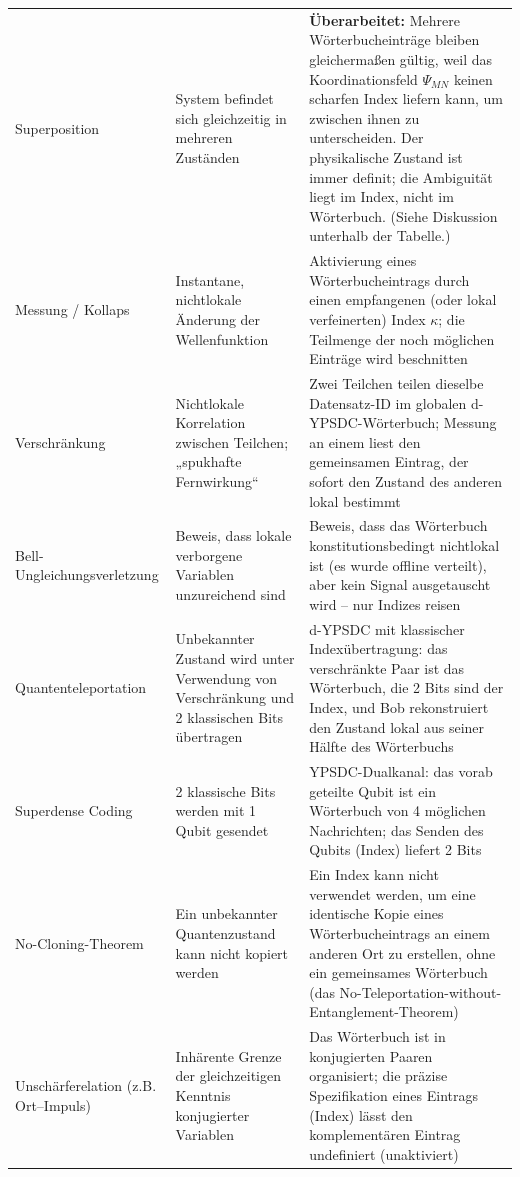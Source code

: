 \documentclass[12pt,a4paper]{article}
\theoremstyle{remark}
\begin{document}
\begin{longtable}{p{3.8cm} p{5cm} p{7cm}}
		Superposition &
		System befindet sich gleichzeitig in mehreren Zuständen &
		\textbf{Überarbeitet:} Mehrere Wörterbucheinträge bleiben gleichermaßen gültig, weil das Koordinationsfeld \(\Psi_{MN}\) keinen scharfen Index liefern kann, um zwischen ihnen zu unterscheiden. Der physikalische Zustand ist immer definit; die Ambiguität liegt im Index, nicht im Wörterbuch. (Siehe Diskussion unterhalb der Tabelle.) \\
		\addlinespace
		Messung / Kollaps &
		Instantane, nichtlokale Änderung der Wellenfunktion &
		Aktivierung eines Wörterbucheintrags durch einen empfangenen (oder lokal verfeinerten) Index \(\kappa\); die Teilmenge der noch möglichen Einträge wird beschnitten \\
		\addlinespace
		Verschränkung &
		Nichtlokale Korrelation zwischen Teilchen; „spukhafte Fernwirkung“ &
		Zwei Teilchen teilen dieselbe Datensatz-ID im globalen d-YPSDC-Wörterbuch; Messung an einem liest den gemeinsamen Eintrag, der sofort den Zustand des anderen lokal bestimmt \\
		\addlinespace
		Bell-Ungleichungsverletzung &
		Beweis, dass lokale verborgene Variablen unzureichend sind &
		Beweis, dass das Wörterbuch konstitutionsbedingt nichtlokal ist (es wurde offline verteilt), aber kein Signal ausgetauscht wird – nur Indizes reisen \\
		\addlinespace
		Quantenteleportation &
		Unbekannter Zustand wird unter Verwendung von Verschränkung und 2 klassischen Bits übertragen &
		d-YPSDC mit klassischer Indexübertragung: das verschränkte Paar ist das Wörterbuch, die 2 Bits sind der Index, und Bob rekonstruiert den Zustand lokal aus seiner Hälfte des Wörterbuchs \\
		\addlinespace
		Superdense Coding &
		2 klassische Bits werden mit 1 Qubit gesendet &
		YPSDC-Dualkanal: das vorab geteilte Qubit ist ein Wörterbuch von 4 möglichen Nachrichten; das Senden des Qubits (Index) liefert 2 Bits \\
		\addlinespace
		No-Cloning-Theorem &
		Ein unbekannter Quantenzustand kann nicht kopiert werden &
		Ein Index kann nicht verwendet werden, um eine identische Kopie eines Wörterbucheintrags an einem anderen Ort zu erstellen, ohne ein gemeinsames Wörterbuch (das No-Teleportation-without-Entanglement-Theorem) \\
		\addlinespace
		Unschärferelation (z.B. Ort–Impuls) &
		Inhärente Grenze der gleichzeitigen Kenntnis konjugierter Variablen &
		Das Wörterbuch ist in konjugierten Paaren organisiert; die präzise Spezifikation eines Eintrags (Index) lässt den komplementären Eintrag undefiniert (unaktiviert) \\

\end{longtable}
\end{document}
